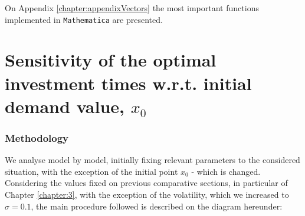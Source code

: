On Appendix \ref{chapter:appendixVectors} the most important functions implemented in \texttt{Mathematica} are presented.

\section{Sensitivity of the optimal investment times w.r.t. initial demand value, $x_0$}
\label{section:x0}

\subsubsection{Methodology}


We analyse model by model, initially fixing relevant parameters to the considered situation, with the exception of the initial point $x_0$ - which is changed.
Considering the values fixed on previous comparative sections, in particular of Chapter \ref{chapter:3}, with the exception of the volatility, which we increased to $\sigma=0.1$, the main procedure followed is described on the diagram hereunder:

